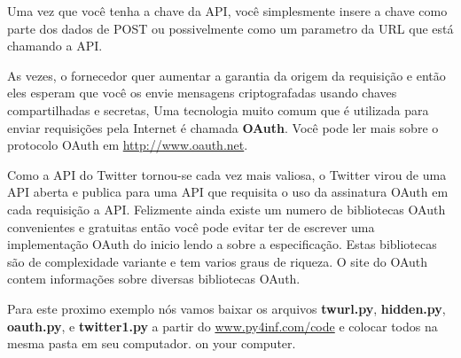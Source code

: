 Uma vez que você tenha a chave da API, você simplesmente
insere a chave como parte dos dados de POST ou possivelmente
como um parametro da URL que está chamando a API.

As vezes, o fornecedor quer aumentar a garantia da 
origem da requisição e então eles esperam que você os
envie mensagens criptografadas usando chaves compartilhadas
e secretas, Uma tecnologia muito comum que é utilizada para 
enviar requisições pela Internet é chamada {\bf OAuth}.
Você pode ler mais sobre o protocolo OAuth em 
\url{http://www.oauth.net}.

Como a API do Twitter tornou-se cada vez mais valiosa, o
Twitter virou de uma API aberta e publica para uma API que
requisita o uso da assinatura OAuth em cada requisição a API.
Felizmente ainda existe um numero de bibliotecas OAuth 
convenientes e gratuitas então você pode evitar ter de escrever
uma implementação OAuth do inicio lendo a sobre a especificação.
Estas bibliotecas são de complexidade variante e tem varios
graus de riqueza. O site do OAuth contem informações sobre
diversas bibliotecas OAuth.

Para este proximo exemplo nós vamos baixar os arquivos
{\bf twurl.py}, {\bf hidden.py}, 
{\bf oauth.py}, 
e
{\bf twitter1.py} a partir do 
\url{www.py4inf.com/code} e colocar todos na mesma pasta
em seu computador.
on your computer.

